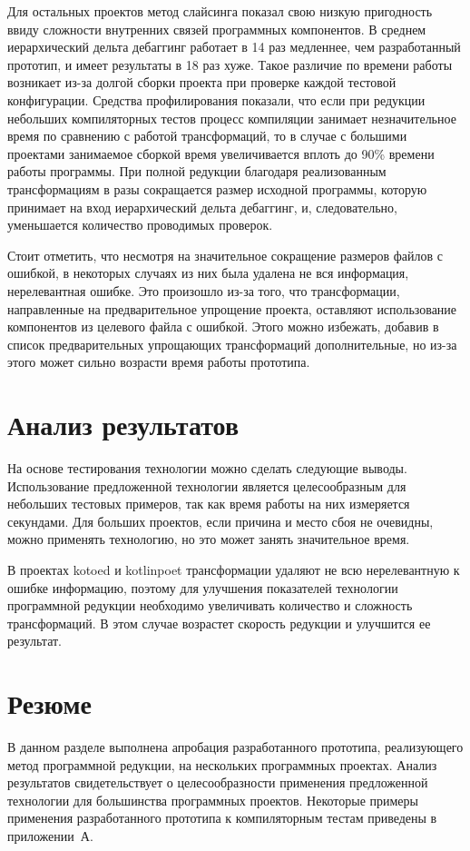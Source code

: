 Для остальных проектов метод слайсинга показал свою низкую пригодность ввиду сложности внутренних связей программных компонентов. В среднем иерархический дельта дебаггинг работает в 14 раз медленнее, чем разработанный прототип, и имеет результаты в 18 раз хуже. Такое различие по времени работы возникает из-за долгой сборки проекта при проверке каждой тестовой конфигурации. Средства профилирования показали, что если при редукции небольших компиляторных тестов процесс компиляции занимает незначительное время по сравнению с работой трансформаций, то в случае с большими проектами занимаемое сборкой время увеличивается вплоть до 90\% времени работы программы. При полной редукции благодаря реализованным трансформациям в разы сокращается размер исходной программы, которую принимает на вход иерархический дельта дебаггинг, и, следовательно, уменьшается количество проводимых проверок.

Стоит отметить, что несмотря на значительное сокращение размеров файлов с ошибкой, в некоторых случаях из них была удалена не вся информация, нерелевантная ошибке. Это произошло из-за того, что трансформации, направленные на предварительное упрощение проекта, оставляют использование компонентов из целевого файла с ошибкой. Этого можно избежать, добавив в список предварительных упрощающих трансформаций дополнительные, но из-за этого может сильно возрасти время работы прототипа.

\section{Анализ результатов}
На основе тестирования технологии можно сделать следующие выводы. Использование предложенной технологии является целесообразным для небольших тестовых примеров, так как время работы на них измеряется секундами. Для больших проектов, если причина и место сбоя не очевидны, можно применять технологию, но это может занять значительное время.

В проектах kotoed и kotlinpoet трансформации удаляют не всю нерелевантную к ошибке информацию, поэтому для улучшения показателей технологии программной редукции необходимо увеличивать количество и сложность трансформаций. В этом случае возрастет скорость редукции и улучшится ее результат.

\section{Резюме}
В данном разделе выполнена апробация разработанного прототипа, реализующего метод программной редукции, на нескольких программных проектах.
Анализ результатов свидетельствует о целесообразности применения предложенной технологии для большинства программных проектов. Некоторые примеры применения разработанного прототипа к компиляторным тестам приведены в приложении~А.
